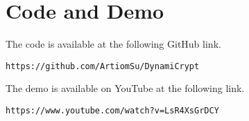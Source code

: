 \section{Code and Demo}
The code is available at the following GitHub link.
\begin{lstlisting}
https://github.com/ArtiomSu/DynamiCrypt
\end{lstlisting}
The demo is available on YouTube at the following link.
\begin{lstlisting}
https://www.youtube.com/watch?v=LsR4XsGrDCY
\end{lstlisting}



















































